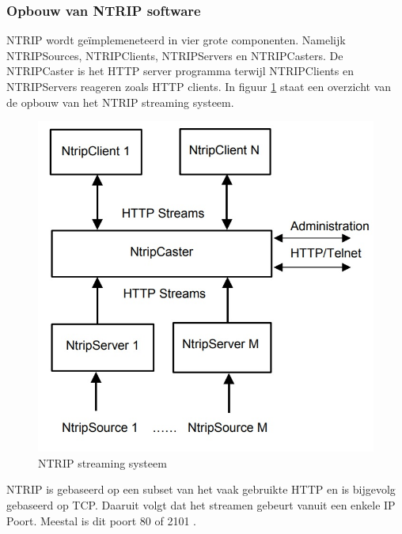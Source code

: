 \subsubsection{Opbouw van NTRIP software}
\label{LONS}
NTRIP wordt ge\"implemeneteerd in vier grote componenten. Namelijk NTRIPSources, NTRIPClients, NTRIPServers en NTRIPCasters. De NTRIPCaster is het HTTP server programma terwijl NTRIPClients en NTRIPServers reageren zoals HTTP clients\cite{LBibNTRIP}.  In figuur \ref{imgNTRIP} staat een overzicht van de opbouw van het NTRIP streaming systeem.

\begin{figure}[hbp]
	\includegraphics[scale=0.55]{NTRIP.jpg}
	\centering
	\caption{NTRIP streaming systeem \cite{LBibNTRIP}}
	\label{imgNTRIP}
\end{figure} 
NTRIP is gebaseerd op een subset van het vaak gebruikte HTTP en is bijgevolg gebaseerd op TCP. Daaruit volgt dat het streamen gebeurt vanuit een enkele IP Poort. Meestal is dit poort 80 of 2101 \cite{LBibNTRIP3}. 

